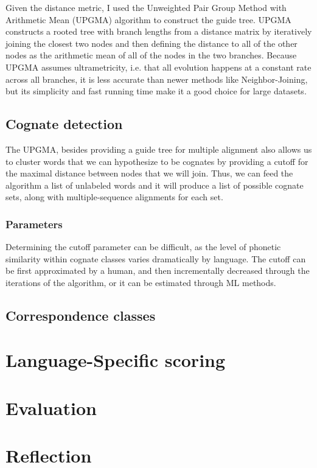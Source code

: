 \documentclass[doc,natbib]{apa6}
\begin{document}
Given the distance metric, I used the Unweighted Pair Group Method with Arithmetic Mean (UPGMA) algorithm to construct the guide tree. UPGMA constructs a rooted tree with branch lengths from a distance matrix by iteratively joining the closest two nodes and then defining the distance to all of the other nodes as the arithmetic mean of all of the nodes in the two branches. Because UPGMA assumes ultrametricity, i.e. that all evolution happens at a constant rate across all branches, it is less accurate than newer methods like Neighbor-Joining, but its simplicity and fast running time make it a good choice for large datasets.

\subsection{Cognate detection}

The UPGMA, besides providing a guide tree for multiple alignment also allows us to cluster words that we can hypothesize to be cognates by providing a cutoff for the maximal distance between nodes that we will join. Thus, we can feed the algorithm a list of unlabeled words and it will produce a list of possible cognate sets, along with multiple-sequence alignments for each set.  
\subsubsection{Parameters}
Determining the cutoff parameter can be difficult, as the level of phonetic similarity within cognate classes varies dramatically by language.  The cutoff can be first approximated by a human, and then incrementally decreased through the iterations of the algorithm, or it can be estimated through ML methods. 

\subsection{Correspondence classes}

\section{Language-Specific scoring}


\section{Evaluation}

\section{Reflection}
\end{document}
